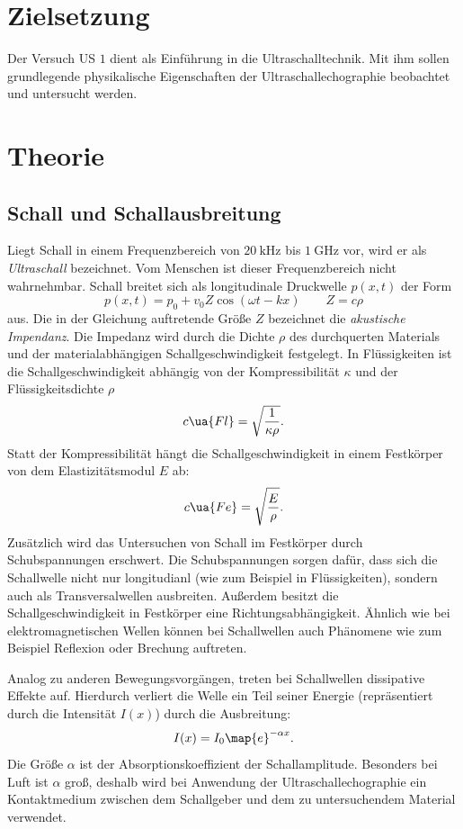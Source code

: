 \setcounter{page}{1}
\section*{Zielsetzung}
Der Versuch US $1$ dient als Einführung in die Ultraschalltechnik.
Mit ihm sollen grundlegende physikalische Eigenschaften der
Ultraschallechographie beobachtet und untersucht werden.
\section{Theorie}
\subsection{Schall und Schallausbreitung}
Liegt Schall in einem Frequenzbereich von $\SI{20}{\kilo\hertz}$ bis $\SI{1}{\giga\hertz}$ vor,
wird er als \emph{Ultraschall} bezeichnet. Vom Menschen ist dieser Frequenzbereich nicht wahrnehmbar.
Schall breitet sich als longitudinale Druckwelle $p(x,t)$ der Form
\begin{equation*}
  p(x,t)=p_0+v_0 Z \cos(\omega t - kx) \qquad Z=c\rho
\end{equation*}
aus. Die in der Gleichung auftretende Größe $Z$ bezeichnet die \emph{akustische Impendanz}.
Die Impedanz wird durch die Dichte $\rho$ des durchquerten Materials und der
materialabhängigen Schallgeschwindigkeit festgelegt.
In Flüssigkeiten ist die Schallgeschwindigkeit abhängig von der
Kompressibilität $\kappa$ und der Flüssigkeitsdichte $\rho$
\begin{equation*}
  c\ua{Fl}=\sqrt{\frac{1}{\kappa\rho}}.
\end{equation*}
Statt der Kompressibilität hängt die Schallgeschwindigkeit in einem Festkörper von
dem Elastizitätsmodul $E$ ab:
\begin{equation*}
  c\ua{Fe}=\sqrt{\frac{E}{\rho}}.
\end{equation*}
Zusätzlich wird das Untersuchen von Schall im Festkörper durch Schubspannungen
erschwert. Die Schubspannungen sorgen dafür, dass sich die Schallwelle nicht nur
longitudianl (wie zum Beispiel in Flüssigkeiten), sondern auch als
Transversalwellen ausbreiten.
Außerdem besitzt die Schallgeschwindigkeit in Festkörper eine Richtungsabhängigkeit.
Ähnlich wie bei elektromagnetischen Wellen können bei Schallwellen auch
Phänomene wie zum Beispiel Reflexion oder Brechung auftreten.

Analog zu anderen Bewegungsvorgängen, treten bei Schallwellen dissipative Effekte auf.
Hierdurch verliert die Welle ein Teil seiner Energie (repräsentiert durch die Intensität $I(x)$) durch die Ausbreitung:
\begin{equation}
  \label{eq:abfall}
  I(x)=I_0\map{e}^{-\alpha x}.
\end{equation}
Die Größe $\alpha$ ist der Absorptionskoeffizient der Schallamplitude.
Besonders bei Luft ist $\alpha$ groß, deshalb wird bei Anwendung der Ultraschallechographie
ein Kontaktmedium zwischen dem Schallgeber und dem zu untersuchendem Material verwendet.

